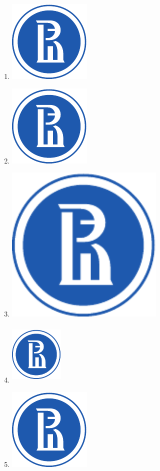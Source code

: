 \documentclass[a4paper,12pt]{article}
\begin{document}
\begin{multicols}{2}
\begin{enumerate}
	\item \includegraphics{3_image.pdf}
	\item \includegraphics[scale=2.5]{3_image.pdf}
	\item \includegraphics[height=3in,keepaspectratio]{3_image.pdf}
	\item \includegraphics[height=30mm,width=26mm]{3_image.pdf}
	\item \includegraphics[height=0.2\textheight]{3_image.pdf}
\end{enumerate}
\end{multicols}
\end{document}
